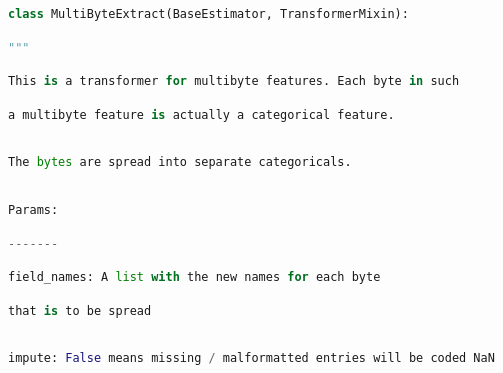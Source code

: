 \documentclass[
  11pt,
  a4paper,
  DIV=12,captions=tableheading,oneside]{scrbook}
\begin{document}
\begin{lstlisting}[language=Python,stepnumber=2,basicstyle=\footnotesize]
\end{lstlisting}
\begin{lstlisting}[language=Python,stepnumber=2,basicstyle=\footnotesize]
class MultiByteExtract(BaseEstimator, TransformerMixin):\end{lstlisting}
\begin{lstlisting}[language=Python,stepnumber=2,basicstyle=\footnotesize]
    """\end{lstlisting}
\begin{lstlisting}[language=Python,stepnumber=2,basicstyle=\footnotesize]
    This is a transformer for multibyte features. Each byte in such\end{lstlisting}
\begin{lstlisting}[language=Python,stepnumber=2,basicstyle=\footnotesize]
    a multibyte feature is actually a categorical feature.\end{lstlisting}
\begin{lstlisting}[language=Python,stepnumber=2,basicstyle=\footnotesize]
\end{lstlisting}
\begin{lstlisting}[language=Python,stepnumber=2,basicstyle=\footnotesize]
    The bytes are spread into separate categoricals.\end{lstlisting}
\begin{lstlisting}[language=Python,stepnumber=2,basicstyle=\footnotesize]
\end{lstlisting}
\begin{lstlisting}[language=Python,stepnumber=2,basicstyle=\footnotesize]
    Params:\end{lstlisting}
\begin{lstlisting}[language=Python,stepnumber=2,basicstyle=\footnotesize]
    -------\end{lstlisting}
\begin{lstlisting}[language=Python,stepnumber=2,basicstyle=\footnotesize]
    field_names: A list with the new names for each byte\end{lstlisting}
\begin{lstlisting}[language=Python,stepnumber=2,basicstyle=\footnotesize]
                    that is to be spread\end{lstlisting}
\begin{lstlisting}[language=Python,stepnumber=2,basicstyle=\footnotesize]
\end{lstlisting}
\begin{lstlisting}[language=Python,stepnumber=2,basicstyle=\footnotesize]
    impute: False means missing / malformatted entries will be coded NaN\end{lstlisting}
\end{document}
